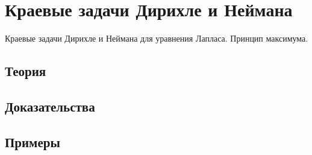 
\section{Краевые задачи Дирихле и Неймана}
\label{sec:2.1.04-elliptic-laplace}

\begin{ticket}
Краевые задачи Дирихле и Неймана для уравнения Лапласа. Принцип максимума.
\end{ticket}

\subsection*{Теория}

\subsection*{Доказательства}

\subsection*{Примеры}
